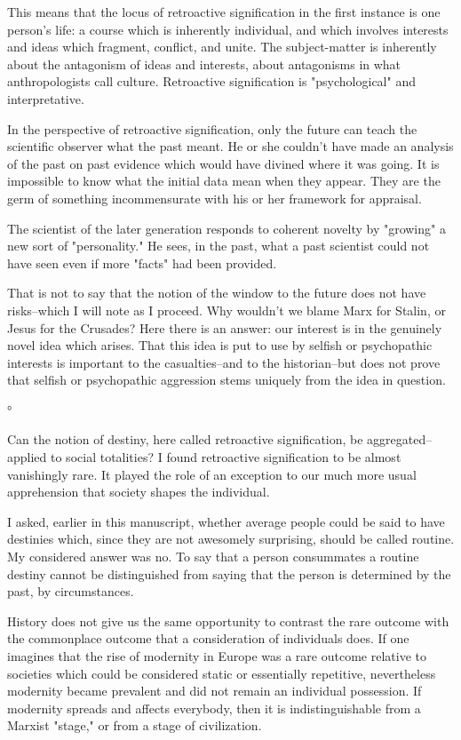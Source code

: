 \begin{enumerate}[label=\alph*.]
This means that the locus of retroactive signification in the first instance is one person’s life: a course which is inherently individual, and which involves interests and ideas which fragment, conflict, and unite. The subject-matter is inherently about the antagonism of ideas and interests, about antagonisms in what anthropologists call culture. Retroactive signification is "psychological" and interpretative.

In the perspective of retroactive signification, only the future can teach the scientific observer what the past meant. He or she couldn’t have made an analysis of the past on past evidence which would have divined where it was going. It is impossible to know what the initial data mean when they appear. They are the germ of something incommensurate with his or her framework for appraisal.

The scientist of the later generation responds to coherent novelty by "growing" a new sort of "personality." He sees, in the past, what a past scientist could not have seen even if more "facts" had been provided.

That is not to say that the notion of the window to the future does not have risks–which I will note as I proceed. Why wouldn’t we blame Marx for Stalin, or Jesus for the Crusades? Here there is an answer: our interest is in the genuinely novel idea which arises. That this idea is put to use by selfish or psychopathic interests is important to the casualties–and to the historian–but does not prove that selfish or psychopathic aggression stems uniquely from the idea in question.

°

Can the notion of destiny, here called retroactive signification, be aggregated–applied to social totalities? I found retroactive signification to be almost vanishingly rare. It played the role of an exception to our much more usual apprehension that society shapes the individual.

I asked, earlier in this manuscript, whether average people could be said to have destinies which, since they are not awesomely surprising, should be called routine. My considered answer was no. To say that a person consummates a routine destiny cannot be distinguished from saying that the person is determined by the past, by circumstances.

History does not give us the same opportunity to contrast the rare outcome with the commonplace outcome that a consideration of individuals does. If one imagines that the rise of modernity in Europe was a rare outcome relative to societies which could be considered static or essentially repetitive, nevertheless modernity became prevalent and did not remain an individual possession. If modernity spreads and affects everybody, then it is indistinguishable from a Marxist "stage," or from a stage of civilization.


\end{enumerate}
